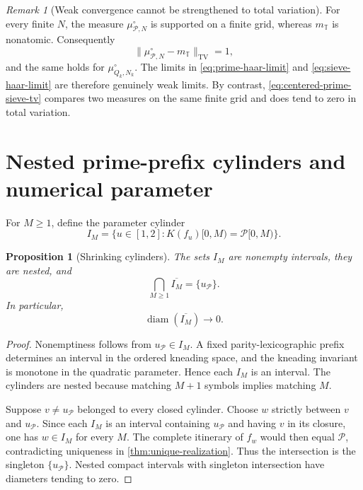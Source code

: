 \documentclass[11pt]{article}
\newtheorem{proposition}[theorem]{Proposition}
\theoremstyle{definition}
\theoremstyle{remark}
\newtheorem{remark}[theorem]{Remark}
\newcommand{\T}{\mathbb{T}}
\newcommand{\cP}{\mathcal{P}}
\newcommand{\uP}{u_{\mathcal P}}
\newcommand{\TV}{\mathrm{TV}}
\DeclareMathOperator{\diam}{diam}
\begin{document}
\begin{remark}[Weak convergence cannot be strengthened to total variation]\label{rem:haar-not-tv}
For every finite $N$, the measure $\mu^{\circ}_{\cP,N}$ is supported on a finite grid, whereas $m_{\T}$ is nonatomic.  Consequently
\[
    \|\mu^{\circ}_{\cP,N}-m_{\T}\|_{\TV}=1,
\]
and the same holds for $\mu^{\circ}_{Q_k,N_k}$.  The limits in \eqref{eq:prime-haar-limit} and \eqref{eq:sieve-haar-limit} are therefore genuinely weak limits.  By contrast, \eqref{eq:centered-prime-sieve-tv} compares two measures on the same finite grid and does tend to zero in total variation.
\end{remark}

\section{Nested prime-prefix cylinders and numerical parameter}

For $M\ge1$, define the parameter cylinder
\begin{equation}\label{eq:parameter-cylinder}
    I_M=\{u\in[1,2]:K(f_u)[0,M)=\cP[0,M)\}.
\end{equation}

\begin{proposition}[Shrinking cylinders]\label{prop:shrinking-cylinders}
The sets $I_M$ are nonempty intervals, they are nested, and
\begin{equation}\label{eq:cylinder-intersection}
    \bigcap_{M\ge1}\overline{I_M}=\{\uP\}.
\end{equation}
In particular,
\begin{equation}\label{eq:cylinder-diameter}
    \diam(\overline{I_M})\longrightarrow0.
\end{equation}
\end{proposition}

\begin{proof}
Nonemptiness follows from $\uP\in I_M$.  A fixed parity-lexicographic prefix determines an interval in the ordered kneading space, and the kneading invariant is monotone in the quadratic parameter.  Hence each $I_M$ is an interval.  The cylinders are nested because matching $M+1$ symbols implies matching $M$.

Suppose $v\ne\uP$ belonged to every closed cylinder.  Choose $w$ strictly between $v$ and $\uP$.  Since each $I_M$ is an interval containing $\uP$ and having $v$ in its closure, one has $w\in I_M$ for every $M$.  The complete itinerary of $f_w$ would then equal $\cP$, contradicting uniqueness in \cref{thm:unique-realization}.  Thus the intersection is the singleton $\{\uP\}$.  Nested compact intervals with singleton intersection have diameters tending to zero.
\end{proof}
\end{document}
